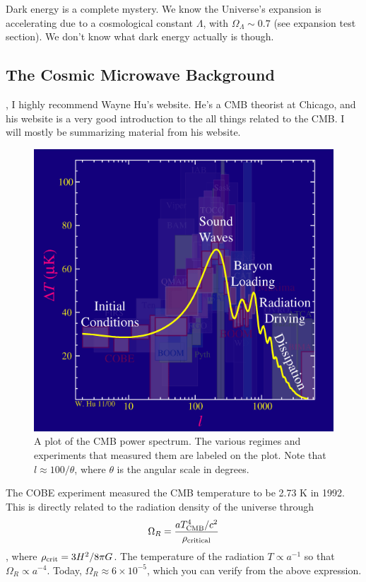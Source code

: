 Dark energy is a complete mystery.  We know the Universe's expansion is 
accelerating due to a cosmological constant $\Lambda$, with 
$\Omega_{\Lambda}\sim0.7$ (see expansion test section).  We don't know what 
dark energy actually is though.  

\subsection{The Cosmic Microwave Background}

, I highly recommend Wayne Hu's website.  He's a CMB theorist at Chicago, and his website is a very good introduction
to the all things related to the CMB.  I will mostly be summarizing material from
his website.

\begin{figure}[ht]
\centering
\includegraphics[width=\textwidth]{cosmology_cmb}
\caption{A plot of the CMB power spectrum.  The various regimes and experiments that measured
         them are labeled on the plot.  Note that $l\approx100/\theta$, where $\theta$ is the
         angular scale in degrees.}
\label{fig:cmb_power_spectrum}
\end{figure}

The COBE experiment measured the CMB temperature to be 2.73 K in 1992.  This is directly
related to the radiation density of the universe through
\begin{dmath}
    \Omega_R = \frac{aT_{\rm CMB}^4/c^2}{\rho_{\rm critical}}
\end{dmath},
where $\rho_{\rm crit} = 3H^2/8\pi G$.  The temperature of the radiation $T\propto a^{-1}$ so
that $\Omega_R\propto a^{-4}$.  Today, $\Omega_R\approx 6\times10^{-5}$, which you can verify
from the above expression.

